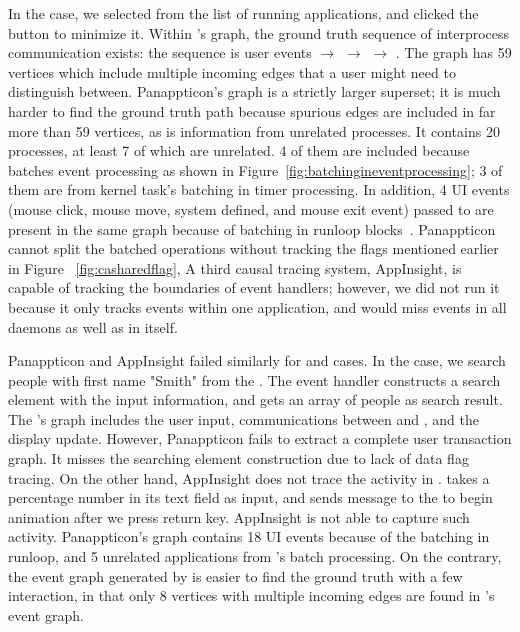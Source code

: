 In the  case, we selected  from the list of running
applications, and clicked the  button to minimize it. Within \xxx's
graph, the ground truth sequence of interprocess communication exists: the
sequence is  user events $\rightarrow$ 
$\rightarrow$  $\rightarrow$ . The graph
has 59 vertices which include multiple incoming edges that a user might need to
distinguish between. Panappticon's graph is a strictly larger superset; it is
much harder to find the ground truth path because spurious edges are included
in far more than 59 vertices, as is information from unrelated processes.
It contains 20 processes, at least 7 of which are unrelated. 4 of them are
included because  batches event processing as shown in
Figure~\ref{fig:batchingineventprocessing}; 3 of them are from kernel task's
batching in timer processing. In addition, 4 UI events (mouse click, mouse move,
system defined, and mouse exit event) passed to  are present in the
same graph because of batching in runloop blocks~\cite{runloop}. Panappticon
cannot split the batched operations without tracking the flags mentioned earlier
in Figure ~\ref{fig:casharedflag}, A third causal tracing system, AppInsight, is
capable of tracking the boundaries of event handlers; however, we did not run it
because it only tracks events within one application, and would miss events in
all daemons as well as in  itself. 

Panappticon and AppInsight failed similarly for  and
 cases. In the  case, we search people with
first name "Smith" from the . The event handler constructs a
search element with the input information, and gets an array of people as
search result. The \xxx's graph includes the user input, communications between
 and , and the display update. However, Panappticon fails
to extract a complete user transaction graph. It misses the searching element
construction due to lack of data flag tracing. On the other hand, AppInsight
does not trace the activity in .  takes a percentage
number in its text field as input, and sends message to the 
to begin animation after we press return key. AppInsight is not able to capture
such activity. Panappticon's graph contains 18 UI events because of the batching
in runloop, and 5 unrelated applications from 's batch
processing. On the contrary, the event graph generated by \xxx is easier to find
the ground truth with a few interaction, in that only 8 vertices with multiple
incoming edges are found in \xxx's event graph.


